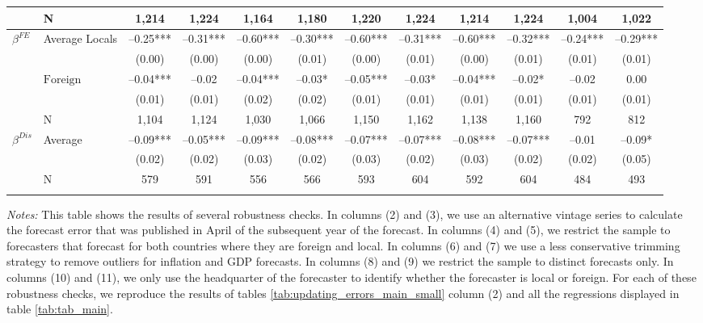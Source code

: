 \begin{table}[H]
{\begin{tabularx}{\linewidth}{l l C C C C C C C C C C}
&N&1,214&1,224&1,164&1,180&1,220&1,224&1,214&1,224&1,004&1,022 \tabularnewline
\midrule $\beta^{FE}$&Average Locals&--0.25***&--0.31***&--0.60***&--0.30***&--0.60***&--0.31***&--0.60***&--0.32***&--0.24***&--0.29*** \tabularnewline
&&(0.00)&(0.00)&(0.00)&(0.01)&(0.00)&(0.01)&(0.00)&(0.01)&(0.01)&(0.01) \tabularnewline
&$ \text{Foreign} $&--0.04***&--0.02&--0.04***&--0.03*&--0.05***&--0.03*&--0.04***&--0.02*&--0.02&0.00 \tabularnewline
&&(0.01)&(0.01)&(0.02)&(0.02)&(0.01)&(0.01)&(0.01)&(0.01)&(0.01)&(0.01) \tabularnewline
&N&1,104&1,124&1,030&1,066&1,150&1,162&1,138&1,160&792&812 \tabularnewline
\midrule $\beta^{Dis}$&Average&--0.09***&--0.05***&--0.09***&--0.08***&--0.07***&--0.07***&--0.08***&--0.07***&--0.01&--0.09* \tabularnewline
&&(0.02)&(0.02)&(0.03)&(0.02)&(0.03)&(0.02)&(0.03)&(0.02)&(0.02)&(0.05) \tabularnewline
&N&579&591&556&566&593&604&592&604&484&493 \tabularnewline
\bottomrule \addlinespace[\belowrulesep]

\end{tabularx}
\begin{flushleft}
\footnotesize \begin{minipage}{1\linewidth} \vspace{-10pt} \begin{tabnote} {\footnotesize{ \textit{Notes:} This table shows the results of several robustness checks. In columns (2) and (3), we use an alternative vintage series to calculate the forecast error that was published in April of the subsequent year of the forecast. In columns (4) and (5), we restrict the sample to forecasters that forecast for both countries where they are foreign and local. In columns (6) and (7) we use a less conservative trimming strategy to remove outliers for inflation and GDP forecasts. In columns (8) and (9) we restrict the sample to distinct forecasts only. In columns (10) and (11), we only use the headquarter of the forecaster to identify whether the forecaster is local or foreign. For each of these robustness checks, we reproduce the results of tables \ref{tab:updating_errors_main_small} column (2) and all the regressions displayed in table \ref{tab:tab_main}.}} \end{tabnote} \end{minipage}  
\end{flushleft}
}
\end{table}
